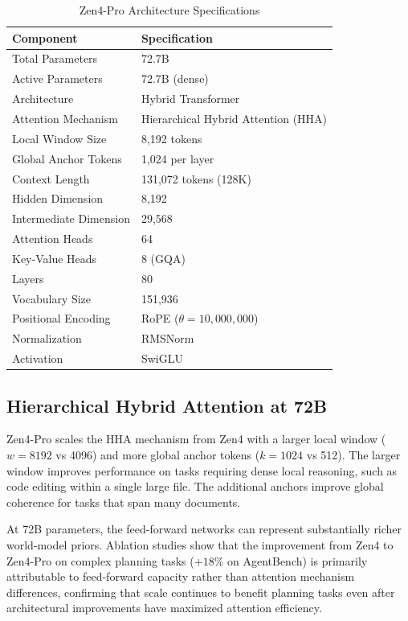 \documentclass[11pt,a4paper]{article}
\begin{document}
\begin{table}[H]
\centering
\begin{tabular}{ll}
\toprule
\textbf{Component} & \textbf{Specification} \\
\midrule
Total Parameters         & 72.7B \\
Active Parameters        & 72.7B (dense) \\
Architecture             & Hybrid Transformer \\
Attention Mechanism      & Hierarchical Hybrid Attention (HHA) \\
Local Window Size        & 8,192 tokens \\
Global Anchor Tokens     & 1,024 per layer \\
Context Length           & 131,072 tokens (128K) \\
Hidden Dimension         & 8,192 \\
Intermediate Dimension   & 29,568 \\
Attention Heads          & 64 \\
Key-Value Heads          & 8 (GQA) \\
Layers                   & 80 \\
Vocabulary Size          & 151,936 \\
Positional Encoding      & RoPE ($\theta = 10{,}000{,}000$) \\
Normalization            & RMSNorm \\
Activation               & SwiGLU \\
\bottomrule
\end{tabular}
\caption{Zen4-Pro Architecture Specifications}
\end{table}

\subsection{Hierarchical Hybrid Attention at 72B}

Zen4-Pro scales the HHA mechanism from Zen4 with a larger local window ($w = 8192$ vs 4096)
and more global anchor tokens ($k = 1024$ vs 512). The larger window improves performance on
tasks requiring dense local reasoning, such as code editing within a single large file.
The additional anchors improve global coherence for tasks that span many documents.

At 72B parameters, the feed-forward networks can represent substantially richer world-model
priors. Ablation studies show that the improvement from Zen4 to Zen4-Pro on complex planning
tasks ($+18\%$ on AgentBench) is primarily attributable to feed-forward capacity rather than
attention mechanism differences, confirming that scale continues to benefit planning tasks even
after architectural improvements have maximized attention efficiency.
\end{document}
